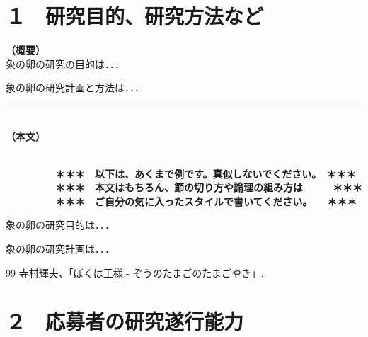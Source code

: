 \documentclass[11pt,a4j,dvipdfmx]{jarticle} 					%
\newcommand{\研究課題名}{象の卵}
\newcommand{\研究機関名}{逢坂大学}
\newcommand{\研究代表者氏名}{湯川秀樹}
\newcommand{\研究期間の最終元号年度}{7}  %
\begin{document}

\section{１　研究目的、研究方法など}

\noindent
\textbf{（概要）}\\
	象の卵の研究の目的は．．．	

	象の卵の研究計画と方法は．．．
	\vspace*{10zw}	%

\noindent
\rule{\linewidth}{1pt}\\
\noindent
\textbf{（本文）}
\JSPSInstructions	%

\textbf{\\　　　　　＊＊＊　以下は、あくまで例です。真似しないでください。　＊＊＊\\
　　　　　＊＊＊　本文はもちろん、節の切り方や論理の組み方は　　　＊＊＊\\
　　　　　＊＊＊　ご自分の気に入ったスタイルで書いてください。　　＊＊＊}

	 象の卵の研究目的は．．．

	象の卵の研究計画は．．．

		

	\vspace{1cm}
	\begin{thebibliography}{99}
		 寺村輝夫、「ぼくは王様 - ぞうのたまごのたまごやき」.
	\end{thebibliography}




\section{２　応募者の研究遂行能力}
\end{document}
